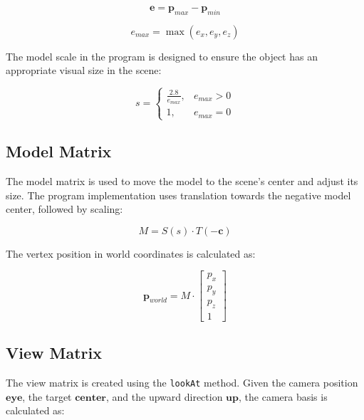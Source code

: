 \documentclass[12pt,a4paper]{article}
\begin{document}
\begin{equation}
    \mathbf{e} = \mathbf{p}_{max} - \mathbf{p}_{min}
\end{equation}

\begin{equation}
    e_{max} = \max(e_x, e_y, e_z)
\end{equation}

The model scale in the program is designed to ensure the object has an
appropriate visual size in the scene:

\begin{equation}
    s =
    \begin{cases}
        \frac{2.8}{e_{max}}, & e_{max} > 0 \\
        1, & e_{max} = 0
    \end{cases}
\end{equation}

\subsection{Model Matrix}

The model matrix is used to move the model to the scene's center and adjust its size.
The program implementation uses translation towards the negative model center,
followed by scaling:

\begin{equation}
    M = S(s) \cdot T(-\mathbf{c})
\end{equation}

The vertex position in world coordinates is calculated as:

\begin{equation}
    \mathbf{p}_{world} = M \cdot
    \begin{bmatrix}
        p_x \\ p_y \\ p_z \\ 1
    \end{bmatrix}
\end{equation}

\subsection{View Matrix}

The view matrix is created using the \texttt{lookAt} method. Given the camera
position $\mathbf{eye}$, the target $\mathbf{center}$, and the upward direction
$\mathbf{up}$, the camera basis is calculated as:
\end{document}
